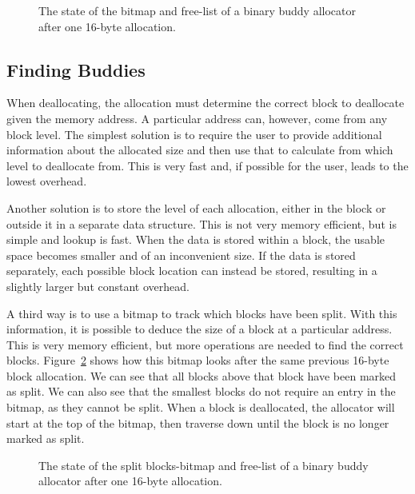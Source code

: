 \begin{figure}[H]
    \centering
    
    \caption{The state of the bitmap and free-list of a binary buddy allocator after one 16-byte allocation.}
    \label{fig:buddybmapallocated}
\end{figure}

\subsection{Finding Buddies}
When deallocating, the allocation must determine the correct block to deallocate given the memory address. A particular address can, however, come from any block level. The simplest solution is to require the user to provide additional information about the allocated size and then use that to calculate from which level to deallocate from. This is very fast and, if possible for the user, leads to the lowest overhead.

Another solution is to store the level of each allocation, either in the block or outside it in a separate data structure. This is not very memory efficient, but is simple and lookup is fast. When the data is stored within a block, the usable space becomes smaller and of an inconvenient size. If the data is stored separately, each possible block location can instead be stored, resulting in a slightly larger but constant overhead.

A third way is to use a bitmap to track which blocks have been split. With this information, it is possible to deduce the size of a block at a particular address. This is very memory efficient, but more operations are needed to find the correct blocks. Figure~\ref{fig:buddybmapsplit} shows how this bitmap looks after the same previous 16-byte block allocation. We can see that all blocks above that block have been marked as split. We can also see that the smallest blocks do not require an entry in the bitmap, as they cannot be split. When a block is deallocated, the allocator will start at the top of the bitmap, then traverse down until the block is no longer marked as split.

\begin{figure}[H]
    \centering
    
    \caption{The state of the split blocks-bitmap and free-list of a binary buddy allocator after one 16-byte allocation.}
    \label{fig:buddybmapsplit}
\end{figure}

